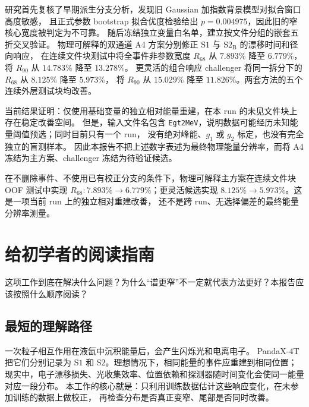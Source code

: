 \documentclass[UTF8,12pt,a4paper,oneside,fontset=none]{ctexart}
\numberwithin{equation}{section}
\newcommand{\Sone}{\mathrm{S1}}
\newcommand{\Stwo}{\mathrm{S2}}
\newcommand{\StwoB}{\mathrm{S2}_{\mathrm{B}}}
\newcommand{\Rsixtyeight}{R_{68}}
\newcommand{\Rninety}{R_{90}}
\begin{document}
研究首先复核了早期派生分支分析，发现旧 Gaussian 加指数背景模型对拟合窗口高度敏感，
且正式参数 bootstrap 拟合优度检验给出 \(p=0.004975\)，因此旧的窄核心宽度被判定为不可靠。
随后冻结独立变量白名单，建立按文件分组的嵌套五折交叉验证。
物理可解释的双通道 A4 方案分别修正 \(\Sone\) 与 \(\StwoB\) 的漂移时间和径向响应，
在连续文件块测试中将全事件非参数宽度 \(\Rsixtyeight\) 从 \(7.893\%\) 降至 \(6.779\%\)，
将 \(\Rninety\) 从 \(14.783\%\) 降至 \(13.278\%\)。
更灵活的组合响应 challenger 将同一拆分下的 \(\Rsixtyeight\) 从 \(8.125\%\) 降至 \(5.973\%\)，
将 \(\Rninety\) 从 \(15.029\%\) 降至 \(11.826\%\)。两套方法的五个连续外层测试块均改善。

当前结果证明：仅使用基础变量的独立相对能量重建，在本 run 的未见文件块上存在稳定改善空间。
但是，输入文件名包含 \texttt{Egt2MeV}，说明数据可能经历未知能量阈值预选；同时目前只有一个 run，
没有绝对峰能、\(g_1\) 或 \(g_2\) 标定，也没有完全独立的盲测样本。
因此本报告不把上述数字表述为最终物理能量分辨率，而将 A4 冻结为主方案、challenger 冻结为待验证候选。

\begin{resultbox}[title={一句话成果}]
在不删除事件、不使用已有校正分支的条件下，物理可解释主方案在连续文件块 OOF 测试中实现
\(\Rsixtyeight:7.893\%\rightarrow6.779\%\)；更灵活候选实现
\(8.125\%\rightarrow5.973\%\)。这是一项当前 run 上的独立相对重建改善，
还不是跨 run、无选择偏差的最终能量分辨率测量。
\end{resultbox}

\clearpage
\tableofcontents
\clearpage
{}

\section{给初学者的阅读指南}

\begin{questionbox}
这项工作到底在解决什么问题？为什么“谱更窄”不一定就代表方法更好？本报告应该按照什么顺序阅读？
\end{questionbox}

\subsection{最短的理解路径}

一次粒子相互作用在液氙中沉积能量后，会产生闪烁光和电离电子。
PandaX-4T 把它们分别记录为 \(\Sone\) 和 \(\Stwo\)。理想情况下，相同能量的事件应重建到相同位置；
现实中，电子漂移损失、光收集效率、位置依赖和探测器随时间变化会使同一能量对应一段分布。
本工作的核心就是：只利用训练数据估计这些响应变化，在未参加训练的数据上做校正，
再检查分布是否真正变窄、尾部是否同时改善。
\end{document}
